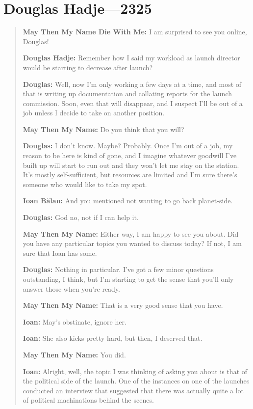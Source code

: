 \hypertarget{douglas-hadje-2325}{%
\chapter{Douglas Hadje—2325}\label{douglas-hadje-2325}}

\begin{quote}
\textbf{May Then My Name Die With Me:} I am surprised to see you online, Douglas!

\textbf{Douglas Hadje:} Remember how I said my workload as launch director would be starting to decrease after launch?

\textbf{Douglas:} Well, now I'm only working a few days at a time, and most of that is writing up documentation and collating reports for the launch commission. Soon, even that will disappear, and I suspect I'll be out of a job unless I decide to take on another position.

\textbf{May Then My Name:} Do you think that you will?

\textbf{Douglas:} I don't know. Maybe? Probably. Once I'm out of a job, my reason to be here is kind of gone, and I imagine whatever goodwill I've built up will start to run out and they won't let me stay on the station. It's mostly self-sufficient, but resources are limited and I'm sure there's someone who would like to take my spot.

\textbf{Ioan Bălan:} And you mentioned not wanting to go back planet-side.

\textbf{Douglas:} God no, not if I can help it.

\textbf{May Then My Name:} Either way, I am happy to see you about. Did you have any particular topics you wanted to discuss today? If not, I am sure that Ioan has some.

\textbf{Douglas:} Nothing in particular. I've got a few minor questions outstanding, I think, but I'm starting to get the sense that you'll only answer those when you're ready.

\textbf{May Then My Name:} That is a very good sense that you have.

\textbf{Ioan:} May's obstinate, ignore her.

\textbf{Ioan:} She also kicks pretty hard, but then, I deserved that.

\textbf{May Then My Name:} You did.

\textbf{Ioan:} Alright, well, the topic I was thinking of asking you about is that of the political side of the launch. One of the instances on one of the launches conducted an interview that suggested that there was actually quite a lot of political machinations behind the scenes.


\end{quote}
